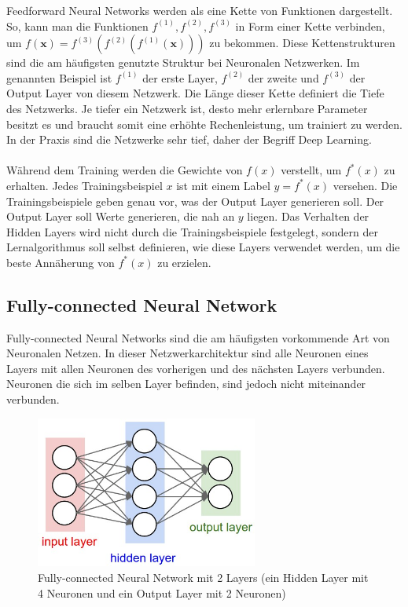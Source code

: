 Feedforward Neural Networks werden als eine Kette von Funktionen dargestellt. So,
kann man die Funktionen $ f^{(1)}, f^{(2)}, f^{(3)} $ in Form einer Kette verbinden, um $ f(\textbf{x}) = f^{(3)}(f^{(2)}(f^{(1)}(\textbf{x}))) $
zu bekommen. Diese Kettenstrukturen sind die am häufigsten genutzte Struktur bei Neuronalen Netzwerken. Im genannten Beispiel ist $ f^{(1)} $ der
erste Layer, $ f^{(2)} $ der zweite und $ f^{(3)} $ der Output Layer von diesem Netzwerk. Die Länge dieser Kette definiert die Tiefe des Netzwerks.
Je tiefer ein Netzwerk ist, desto mehr erlernbare Parameter besitzt es und braucht somit eine erhöhte Rechenleistung, um trainiert zu werden.
In der Praxis sind die Netzwerke sehr tief, daher der Begriff Deep Learning.
\\
\\
Während dem Training werden die Gewichte von $ f(x) $ verstellt, um $ f^*(x) $ zu erhalten. Jedes Trainingsbeispiel $ x $ ist mit einem Label
$ y = f^*(x)$ versehen. Die Trainingsbeispiele geben genau vor, was der Output Layer generieren soll. Der Output Layer soll Werte generieren,
die nah an $ y $ liegen. Das Verhalten der Hidden Layers wird nicht durch die Trainingsbeispiele festgelegt, sondern der Lernalgorithmus
soll selbst definieren, wie diese Layers verwendet werden, um die beste Annäherung von $ f^*(x) $ zu erzielen.

\subsection{Fully-connected Neural Network}
Fully-connected Neural Networks sind die am häufigsten vorkommende Art von Neuronalen Netzen. In dieser Netzwerkarchitektur sind alle Neuronen
eines Layers mit allen Neuronen des vorherigen und des nächsten Layers verbunden. Neuronen die sich im selben Layer befinden, 
sind jedoch nicht miteinander verbunden.
\cite{cs231-neural-networks}

\begin{figure}[H]
  \centering
  \includegraphics[width=0.65\textwidth]{resources/nn/neural_net.jpeg}
  \caption{
    Fully-connected Neural Network mit 2 Layers (ein Hidden Layer mit 4 Neuronen und ein Output Layer mit 2 Neuronen)
    \cite{fully-connected-neural-network}
  }
  \label{image:neuronal-network}
\end{figure}

